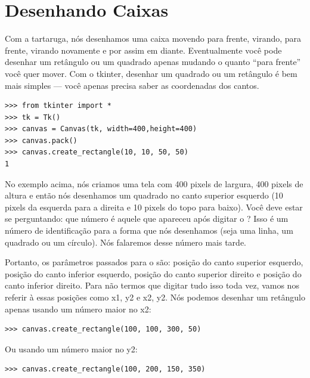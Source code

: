 \section{Desenhando Caixas}

Com a tartaruga, nós desenhamos uma caixa movendo para frente, virando, para frente, virando novamente e por assim em diante. Eventualmente você pode desenhar um retângulo ou um quadrado apenas mudando o quanto ``para frente'' você quer mover. Com o tkinter, desenhar um quadrado ou um retângulo é bem mais simples --- você apenas precisa saber as coordenadas dos cantos.

\begin{listingignore}
\begin{verbatim}
>>> from tkinter import *
>>> tk = Tk()
>>> canvas = Canvas(tk, width=400,height=400)
>>> canvas.pack()
>>> canvas.create_rectangle(10, 10, 50, 50)
1
\end{verbatim}
\end{listingignore}

No exemplo acima, nós criamos uma tela com 400 pixels de largura, 400 pixels de altura e então nós desenhamos um quadrado no canto superior esquerdo (10 pixels da esquerda para a direita e 10 pixels do topo para baixo). Você deve estar se perguntando: que número é aquele que apareceu após digitar o ? Isso é um número de identificação para a forma que nós desenhamos (seja uma linha, um quadrado ou um círculo). Nós falaremos desse número mais tarde.

Portanto, os parâmetros passados para o  são: posição do canto superior esquerdo, posição do canto inferior esquerdo, posição do canto superior direito e posição do canto inferior direito. Para não termos que digitar tudo isso toda vez, vamos nos referir à essas posições como x1, y2 e x2, y2. Nós podemos desenhar um retângulo apenas usando um número maior no x2:

\begin{listing}
\begin{verbatim}
>>> canvas.create_rectangle(100, 100, 300, 50)
\end{verbatim}
\end{listing}

\noindent
Ou usando um número maior no y2:

\begin{listing}
\begin{verbatim}
>>> canvas.create_rectangle(100, 200, 150, 350)
\end{verbatim}
\end{listing}

